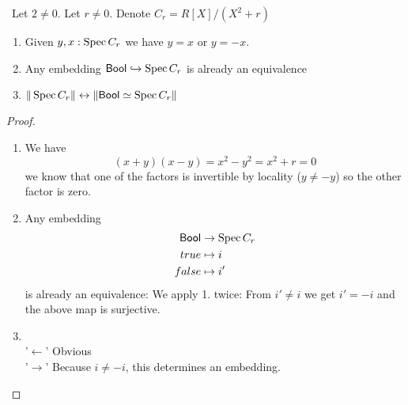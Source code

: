 \begin{lemma}{\label{lemma:BoolSpecC}}
	\
	Let $2 \neq 0$. Let $r \neq 0 $. Denote $C_r = R[X] / (X^2 + r)$
	\begin{enumerate}
		\item Given $y,x : \operatorname{Spec} C_r$ we have $y = x$ or $y = -x$.
		\item 	Any embedding $\mathsf{Bool} \hookrightarrow \operatorname{Spec} C_r$ is already an equivalence 
		
		\item 	$\| \operatorname{Spec} C_r \| \leftrightarrow \|\mathsf{Bool} \simeq \operatorname{Spec} C_r\|$	\end{enumerate}
\end{lemma}
\begin{proof}
	\begin{enumerate}
		\item We have \[(x+y)(x-y) = x^2 - y^2 = x^2 + r = 0\]
		we know that one of the factors is invertible by locality ($y \neq -y$) so the other factor is zero. 
		\item 	Any embedding 
		\begin{align*}
			\mathsf{Bool} &\to \operatorname{Spec} C_r \\
			true &\mapsto i \\
			false &\mapsto i'
		\end{align*}
		is already an equivalence: We apply 1. twice: From $i' \neq i$ we get $i' = -i$ and the above map is surjective.
		\item 	\ \\ '$\leftarrow$' 
		Obvious \\
		'$\rightarrow$'  Because $i \neq -i$, this determines an embedding.
	\end{enumerate}
	
\end{proof}

